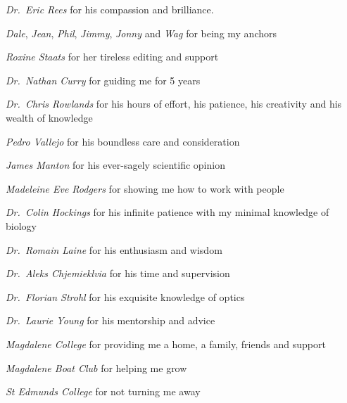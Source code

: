 
\begin{acknowledgements}
\begin{description}%
  \item \emph{Dr.~Eric Rees} for his compassion and brilliance.
  \item \emph{Dale}, \emph{Jean}, \emph{Phil}, \emph{Jimmy}, \emph{Jonny} and \emph{Wag} for being my anchors
  \item \emph{Roxine Staats} for her tireless editing and support
  \item \emph{Dr.~Nathan Curry} for guiding me for 5 years
  \item \emph{Dr.~Chris Rowlands} for his hours of effort, his patience, his creativity and his wealth of knowledge
  \item \emph{Pedro Vallejo} for his boundless care and consideration
  \item \emph{James Manton} for his ever-sagely scientific opinion
  \item \emph{Madeleine Eve Rodgers} for showing me how to work with people
  \item \emph{Dr.~Colin Hockings} for his infinite patience with my minimal knowledge of biology
  \item \emph{Dr.~Romain Laine} for his enthusiasm and wisdom
  \item \emph{Dr.~Aleks Chjemieklvia} for his time and supervision
  \item \emph{Dr.~Florian Strohl} for his exquisite knowledge of optics
  \item \emph{Dr.~Laurie Young} for his mentorship and advice
  \item \emph{Magdalene College} for providing me a home, a family, friends and support
  \item \emph{Magdalene Boat Club} for helping me grow
  \item \emph{St Edmunds College} for not turning me away
\end{description}
\end{acknowledgements}
